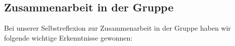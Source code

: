 \subsection{Zusammenarbeit in der Gruppe}

Bei unserer Selbstreflexion zur Zusammenarbeit in der Gruppe haben wir folgende wichtige Erkenntnisse gewonnen:

